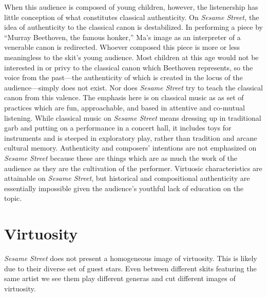 \documentclass[12pt,letterpaper]{article}
\newcommand{\ses}{\textit{Sesame Street }}
\begin{document}
        When this audience is composed of young children, however, the 
	listenership has little conception of what constitutes classical 
	authenticity. On \textit{Sesame Street,} the idea of authenticity to the
	classical canon is destabilized. In performing a piece by ``Murray 
	Beethoven, the famous honker,'' Ma's image as an interpreter of a 
	venerable canon is redirected. Whoever composed this piece is more or 
	less meaningless to the skit's young audience. Most children at this age
	would not be interested in or privy to the classical canon which 
	Beethoven 
	represents, so the voice from the past---the authenticity of which is 
	created in the locus of the audience---simply does not exist. Nor does 
	\textit{Sesame Street} try to teach the classical canon from this 
	valence. The emphasis here is on 
	classical music as as set of practices which are fun, approachable, and 	based in attentive and co-mutual listening. While classical music on 
	\ses means
	dressing up in traditional garb and putting on a performance in a 
	concert hall, it includes toys for instruments and is steeped in 
	exploratory play, rather than tradition and arcane cultural memory. 
	Authenticity and composers' 
	intentions are not emphasized on \textit{Sesame Street} because these 
	are things which are as much the work of the audience as they are the 
	cultivation of the performer. Virtuosic characteristics 
	are attainable on \textit{Sesame Street}, but historical and 
	compositional authenticity are essentially impossible given the 
	audience's youthful lack of education on the topic. 
	
	\section*{Virtuosity}

	\textit{Sesame Street} does not present a homogeneous image of 
	virtuosity. This 
	is likely due to their diverse set of guest stars. Even between 
	different skits featuring the same artist we see them play different 
	generas and cut different images of virtuosity.
\end{document}
